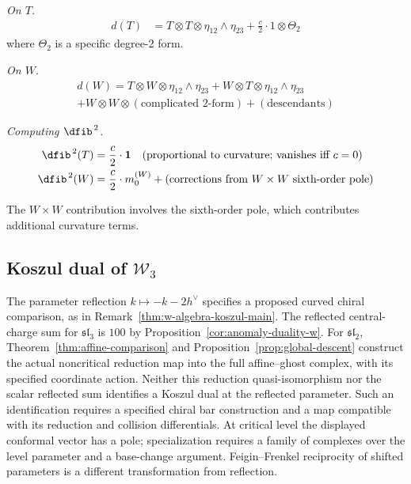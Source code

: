 \begin{computation}
\emph{On $T$.}
\begin{align}
d(T) &= T \otimes T \otimes \eta_{12} \wedge \eta_{23} + \frac{c}{2} \cdot 1 \otimes \Theta_2
\end{align}
where $\Theta_2$ is a specific degree-2 form.

\emph{On $W$.}
\begin{multline}
d(W) = T \otimes W \otimes \eta_{12} \wedge \eta_{23} + W \otimes T \otimes \eta_{12} \wedge \eta_{23} \\
+ W \otimes W \otimes (\text{complicated 2-form}) + (\text{descendants})
\end{multline}

\emph{Computing $\dfib^{\,2}$.}
\begin{align}
\dfib^{\,2}(T) &= \frac{c}{2} \cdot \mathbf{1} \quad \text{(proportional to curvature; vanishes iff $c = 0$)} \\
\dfib^{\,2}(W) &= \frac{c}{2} \cdot m_0^{(W)} + (\text{corrections from } W \times W \text{ sixth-order pole})
\end{align}

The $W \times W$ contribution involves the sixth-order pole, which contributes additional curvature terms.
\end{computation}

\subsection{\texorpdfstring{Koszul dual of $\mathcal{W}_3$}{Koszul dual of W 3}}

\begin{remark}\label{thm:w3-koszul-dual}
The parameter reflection $k\mapsto-k-2h^\vee$ specifies a proposed curved chiral comparison, as in Remark~\ref{thm:w-algebra-koszul-main}.
The reflected central-charge sum for $\mathfrak{sl}_3$ is $100$ by Proposition~\ref{cor:anomaly-duality-w}.
For $\mathfrak{sl}_2$, Theorem~\ref{thm:affine-comparison} and Proposition~\ref{prop:global-descent} construct the actual noncritical reduction map into the full affine--ghost complex, with its specified coordinate action.
Neither this reduction quasi-isomorphism nor the scalar reflected sum identifies a Koszul dual at the reflected parameter.
Such an identification requires a specified chiral bar construction and a map compatible with its reduction and collision differentials.
At critical level the displayed conformal vector has a pole; specialization requires a family of complexes over the level parameter and a base-change argument.
Feigin--Frenkel reciprocity of shifted parameters is a different transformation from reflection.
\end{remark}

